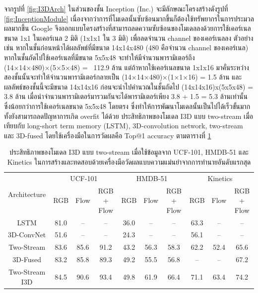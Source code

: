 \clearpage
จากรูปที่ \ref{fig:I3DArch} ในส่วนของชั้น Inception (Inc.) จะมีลักษณะโครงสร้างดังรูปที่ \ref{fig:InceptionModule} เนื่องจากว่าการที่โมเดลนั้นซับซ้อนมากขึ้นก็ต้องใช้ทรัพยากรในการประมวลผลมากขึ้น
Google จึงออกแบบโครงสร้างที่สามารถลดความซับซ้อนของโมเดลลงด้วยการใช้เคอร์เนลขนาด 1x1 ในเคอร์เนล 2 มิติ (1x1x1 ใน 3 มิติ) เพื่อลดจำนวน channel ของเคอร์เนลลง ตัวอย่างเช่น
หากในชั้นก่อนหน้าได้ผลลัพธ์ที่มีขนาด 14x14x480 (480 คือจำนวน channel ของเคอร์เนล) หากในชั้นถัดไปใช้เคอร์เนลที่มีขนาด 5x5x48 จะทำให้มีจำนวนพารามิเตอร์ถึง
(14×14×480)×(5×5×48) = ~112.9 ล้าน แต่ถ้าหากใช้เคอร์เนลขนาด 1x1x16 มาคั่นระหว่างสองชั้นนั้นจะทำให้จำนวนพารามิเตอร์กลายเป็น (14×14×480)×(1×1×16) = 1.5 ล้าน 
และผลลัพธ์ของชั้นนี้จะมีขนาด 14x14x16 ก่อนจะนำไปคำนวณในชั้นถัดไป (14x14x16)x(5x5x48) = 3.8 ล้าน เมื่อนำจำนวนพารามิเตอร์มารวมกันจะได้พารามิเตอร์เพียง 3.8 + 1.5 = 5.3 ล้านเท่านั้น
ซึ่งน้อยกว่าการใช้เคอร์เนลขนาด 5x5x48 โดยตรง ซึ่งทำให้การพัฒนาโมเดลนั้นเป็นไปได้เร็วขั้นมาก ทั้งยังสามารถลดปัญหาการเกิด overfit ได้ด้วย
ประสิทธิภาพของโมเดล I3D แบบ two-stream เมื่อเทียบกับ long-short term memory (LSTM),
3D-convolution network, two-stream และ 3D-fused โดยใช้เครื่องมือในการวัดผลคือ Top@1 accuracy ตามตารางที่ \ref{tab:I3DPerformance}
\begin{table}[!ht]
    \begin{tabular}{|*{10}{c|}}
        \hline
        \multirow{2}{*}{Architecture} & \multicolumn{3}{c|}{UCF-101} & \multicolumn{3}{c|}{HMDB-51} & \multicolumn{3}{c|}{Kinetics}\\
        \cline{2-10}
            & RGB & Flow & RGB + Flow & RGB & Flow & RGB + Flow & RGB & Flow & RGB + Flow\\
        \hline\hline
        LSTM            & 81.0 & – & – & 36.0 & – & – & 63.3 & – & –\\
        3D-ConvNet      & 51.6 & – & – & 24.3 & – & – & 56.1 & – & –\\
        Two-Stream      & 83.6 & 85.6 & 91.2 & 43.2 & 56.3 & 58.3 & 62.2 & 52.4 & 65.6\\
        3D-Fused        & 83.2 & 85.8 & 89.3 & 49.2 & 55.5 & 56.8 & – & – & 67.2\\
        Two-Stream I3D  & 84.5 & 90.6 & 93.4 & 49.8 & 61.9 & 66.4 & 71.1 & 63.4 & 74.2\\
        \hline
    \end{tabular}
    \caption{ประสิทธิภาพของโมเดล I3D แบบ two-stream เมื่อใช้ข้อมูลจาก UCF-101, HMDB-51 และ Kinetics ในการสร้างและทดสอบด้วยเครื่องมือวัดผลแบบความแม่นยำจากการทำนายอันดับแรกสุด}
    \label{tab:I3DPerformance}
\end{table}